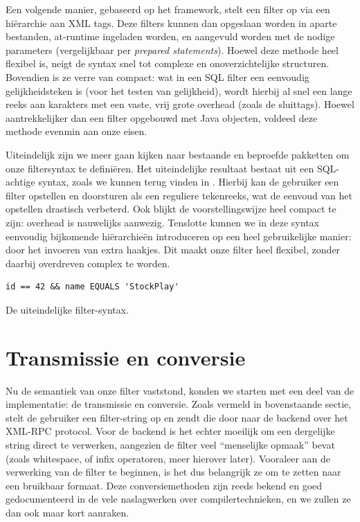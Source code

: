 Een volgende manier, gebaseerd op het  framework, stelt een filter op via een hi\"erarchie aan XML tags. Deze filters kunnen dan opgeslaan worden in aparte bestanden, at-runtime ingeladen worden, en aangevuld worden met de nodige parameters (vergelijkbaar per \emph{prepared statements}). Hoewel deze methode heel flexibel is, neigt de syntax snel tot complexe en onoverzichtelijke structuren. Bovendien is ze verre van compact: wat in een SQL filter een eenvoudig gelijkheidsteken is (voor het testen van gelijkheid), wordt hierbij al snel een lange reeks aan karakters met een vaste, vrij grote overhead (zoals de sluittags). Hoewel aantrekkelijker dan een filter opgebouwd met Java objecten, voldeed deze methode evenmin aan onze eisen.

Uiteindelijk zijn we meer gaan kijken naar bestaande en beproefde pakketten om onze filtersyntax te defini\"eren. Het uiteindelijke resultaat bestaat uit een SQL-achtige syntax, zoals we kunnen terug vinden in . Hierbij kan de gebruiker een filter opstellen en doorsturen als een reguliere tekenreeks, wat de eenvoud van het opstellen drastisch verbeterd. Ook blijkt de voorstellingswijze heel compact te zijn: overhead is nauwelijks aanwezig. Tenslotte kunnen we in deze syntax eenvoudig bijkomende hi\"erarchie\"en introduceren op een heel gebruikelijke manier: door het invoeren van extra haakjes. Dit maakt onze filter heel flexibel, zonder daarbij overdreven complex te worden.

\begin{code}
\begin{verbatim}
id == 42 && name EQUALS 'StockPlay'
\end{verbatim}
\caption{De uiteindelijke filter-syntax.}
\end{code}


\section{Transmissie en conversie}

Nu de semantiek van onze filter vaststond, konden we starten met een deel van de implementatie: de transmissie en conversie.
Zoals vermeld in bovenstaande sectie, stelt de gebruiker een filter-string op en zendt die door naar de backend over het XML-RPC protocol. Voor de backend is het echter moeilijk om een dergelijke string direct te verwerken, aangezien de filter veel ``menselijke opmaak'' bevat (zoals whitespace, of infix operatoren, meer hierover later). Vooraleer aan de verwerking van de filter te beginnen, is het dus belangrijk ze om te zetten naar een bruikbaar formaat.
Deze conversiemethoden zijn reeds bekend en goed gedocumenteerd in de vele naslagwerken over compilertechnieken, en we zullen ze dan ook maar kort aanraken.

